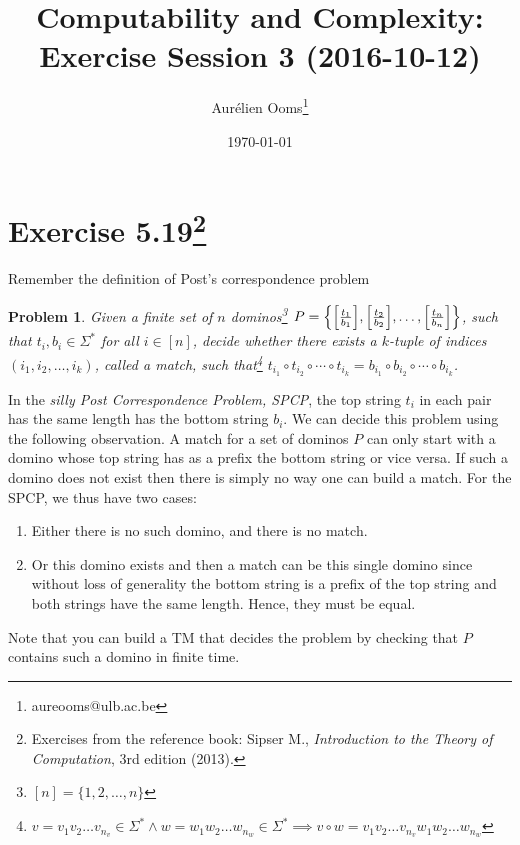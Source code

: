 \documentclass{article}
\title{Computability and Complexity:\\Exercise Session 3 (2016-10-12)}
\author{Aurélien Ooms\footnote{aureooms@ulb.ac.be}}
\date{\today}
\newcommand{\problemname}{Problem}
\newtheorem{problem}{\problemname}
\begin{document}
\maketitle
\tableofcontents

\section{Exercise 5.19\footnote{Exercises from the reference book: Sipser M.,
\emph{Introduction to the Theory of Computation}, 3rd edition (2013).}}

Remember the definition of Post's correspondence problem
\begin{problem}\label{PCP}
	Given a finite set of \(n\) dominos\footnote{\([n] = \{1,2,\ldots,n\}\)}
	\(P = \mleft\{ \mleft[\frac{t_1}{b_1}\mright] , \mleft[\frac{t_2}{b_2}\mright] , \ldots
			, \mleft[\frac{t_n}{b_n}\mright]\mright\}\), such that \(t_i, b_i
		\in \Sigma^*\)
			for all \(i \in [n]\), decide
	whether there exists a \(k\)-tuple of indices \((i_1,i_2,\ldots,i_k)\),
	called a match,
	such that\footnote{\(v = v_1 v_2 \ldots v_{n_v} \in \Sigma^* \land w = w_1 w_2 \ldots
			w_{n_w} \in \Sigma^* \implies v \circ w = v_1 v_2 \ldots v_{n_v} w_1 w_2
	\ldots w_{n_w}\) }
	\(t_{i_1} \circ t_{i_2} \circ \cdots \circ t_{i_k} =
	b_{i_1} \circ b_{i_2} \circ \cdots \circ b_{i_k} \).
\end{problem}

In the \emph{silly Post Correspondence Problem, SPCP}, the top string \(t_i\)
in each pair has the same length has the bottom string \(b_i\). We can decide
this problem using the following observation.
A match for a set of dominos \(P\) can only start with a domino whose top
string has as a prefix the bottom string or vice versa. If such a domino does
not exist then there is simply no way one can build a match.
For the SPCP, we thus have two cases:
\begin{enumerate}
	\item Either there is no such domino, and there is no match.
	\item Or this domino exists and then a match can be this single domino
		since without loss of generality the bottom string is a prefix of the
		top string and both strings have the same length. Hence, they must be
		equal.
\end{enumerate}
Note that you can build a TM that decides the problem by checking that \(P\)
contains such a domino in finite time.
\end{document}
